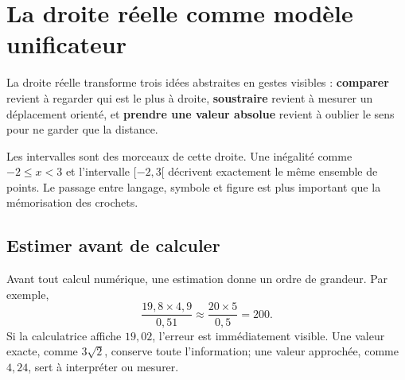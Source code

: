 \documentclass[12pt,a4paper,openany]{book}
\begin{document}
\section{La droite réelle comme modèle unificateur}

\begin{visualbox}
La droite réelle transforme trois idées abstraites en gestes visibles : \textbf{comparer} revient à regarder qui est le plus à droite, \textbf{soustraire} revient à mesurer un déplacement orienté, et \textbf{prendre une valeur absolue} revient à oublier le sens pour ne garder que la distance.
\end{visualbox}

\begin{center}
\end{center}

\begin{connectionbox}
Les intervalles sont des morceaux de cette droite. Une inégalité comme $-2\le x<3$ et l'intervalle $[-2,3[$ décrivent exactement le même ensemble de points. Le passage entre langage, symbole et figure est plus important que la mémorisation des crochets.
\end{connectionbox}

\subsection{Estimer avant de calculer}
Avant tout calcul numérique, une estimation donne un ordre de grandeur. Par exemple,
\[
\frac{19{,}8\times 4{,}9}{0{,}51}\approx\frac{20\times5}{0{,}5}=200.
\]
Si la calculatrice affiche $19{,}02$, l'erreur est immédiatement visible. Une valeur exacte, comme $3\sqrt2$, conserve toute l'information; une valeur approchée, comme $4{,}24$, sert à interpréter ou mesurer.
\end{document}
